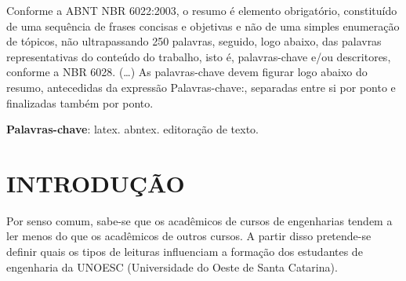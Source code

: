 \documentclass[
	article,			%
	11pt,				%
	oneside,			%
	a4paper,			%
	english,			%
	brazil,				%
	sumario=tradicional
	]{abntex2}
\begin{document}

\frenchspacing 


%
%
\maketitle

\begin{resumoumacoluna}
	Conforme a ABNT NBR 6022:2003, o resumo é elemento obrigatório, constituído de
	uma sequência de frases concisas e objetivas e não de uma simples enumeração
	de tópicos, não ultrapassando 250 palavras, seguido, logo abaixo, das palavras
	representativas do conteúdo do trabalho, isto é, palavras-chave e/ou
	descritores, conforme a NBR 6028. (\ldots) As palavras-chave devem figurar logo
	abaixo do resumo, antecedidas da expressão Palavras-chave:, separadas entre si por
	ponto e finalizadas também por ponto.
	
	\vspace{\onelineskip}
	
	\noindent
	\textbf{Palavras-chave}: latex. abntex. editoração de texto.
\end{resumoumacoluna}


\textual

\section{INTRODUÇÃO}
Por senso comum, sabe-se que os acadêmicos de cursos de engenharias tendem a ler menos do que os acadêmicos de outros cursos. A partir disso pretende-se definir quais os tipos de leituras influenciam a formação dos estudantes de engenharia da UNOESC (Universidade do Oeste de Santa Catarina).
\end{document}
